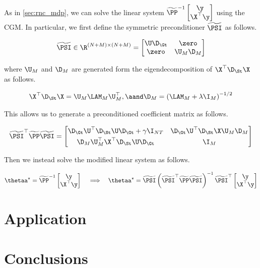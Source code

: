 As in \cref{sec:rnc_mdp}, we can solve the linear system $\widetilde{\PP}^{-1}\begin{bmatrix} \y \\ \X^\top \y \end{bmatrix}$ using the CGM. In particular, we first define the symmetric preconditioner $\widetilde{\PSI}$ as follows. 

\begin{equation}
    \widetilde{\PSI} \in \R^{(N + M) \times (N + M)} = \begin{bmatrix}
        \U \D_\Gt & \zero \\
        \zero & \U_M \D_M 
    \end{bmatrix}
\end{equation}

where $\U_M$ and $\D_M$ are generated form the eigendecomposition of $\X^\top \D_\St \X$ as follows. 

\begin{equation}
    \X^\top \D_\St \X = \U_M \LAM_M \U_M^\top, \aand \D_M = \left(\LAM_M + \lambda \I_M\right)^{-1/2}
\end{equation}

This allows us to generate a preconditioned coefficient matrix as follows.  

\begin{equation*}
    \widetilde{\PSI}^\top \widetilde{\PP}  \widetilde{\PSI} = 
       \begin{bmatrix}
        \D_\Gt \U^\top \D_\St \U \D_\Gt + \gamma \I_{NT}  &  \D_\Gt \U^\top \D_\St \X \U_M \D_M \\[0.1cm] 
        \D_M \U_M^\top \X^\top \D_\St \U \D_\Gt & \I_M
        \end{bmatrix}
\end{equation*}

Then we instead solve the modified linear system as follows.

\begin{equation*}
    \thetaa^\star = \widetilde{\PP}^{-1}\begin{bmatrix} \y \\ \X^\top \y \end{bmatrix}\, \quad \Longrightarrow \quad  \thetaa^\star = \widetilde{\PSI} \left(\widetilde{\PSI}^\top \widetilde{\PP}  \widetilde{\PSI} \right)^{-1}\widetilde{\PSI}^\top \begin{bmatrix} \y \\ \X^\top \y \end{bmatrix}
\end{equation*}





\section{Application}


\section{Conclusions}
